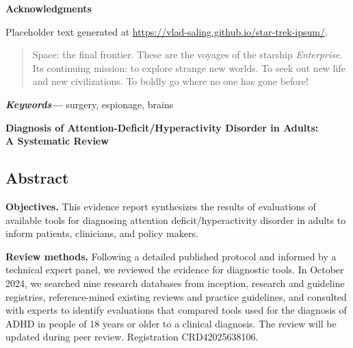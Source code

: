 \documentclass[
  12pt,
  letterpaper,
]{article}
\providecommand{\keywords}[1]{\textbf{\textit{Keywords---}}#1}
\renewcommand{\[}{\begin{singlespace}\oldDisplayMath}
\renewcommand{\]}{\endoldDisplayMath\end{singlespace}\vspace{\baselineskip}}
\begin{document}
\begin{titlepage}
\begin{center}
\end{center}

\begin{center}

\textbf{Acknowledgments}

\par\raggedright\setlength{\parindent}{0.5in}Placeholder text generated
at \url{https://vlad-saling.github.io/star-trek-ipsum/}.

\end{center}

\vfill  %

\end{titlepage}

\doublespacing

\begin{abstract}
\noindent Space: the final frontier. These are the voyages of the
starship \emph{Enterprise}. Its continuing mission: to explore strange
new worlds. To seek out new life and new civilizations. To boldly go
where no one has gone before!
\end{abstract}

\vspace{\baselineskip}

\indent \keywords{%
surgery, espionage, brains%
}

\newpage

\begin{center}
\singlespacing
\textbf{Diagnosis of Attention-Deficit/Hyperactivity Disorder in
Adults:\\A Systematic Review}
\end{center}


\subsection{Abstract}\label{abstract}

\textbf{Objectives.} This evidence report synthesizes the results of
evaluations of available tools for diagnosing attention
deficit/hyperactivity disorder in adults to inform patients, clinicians,
and policy makers.

\textbf{Review methods.} Following a detailed published protocol and
informed by a technical expert panel, we reviewed the evidence for
diagnostic tools. In October 2024, we searched nine research databases
from inception, research and guideline registries, reference-mined
existing reviews and practice guidelines, and consulted with experts to
identify evaluations that compared tools used for the diagnosis of ADHD
in people of 18 years or older to a clinical diagnosis. The review will
be updated during peer review. Registration CRD42025638106.
\end{document}
